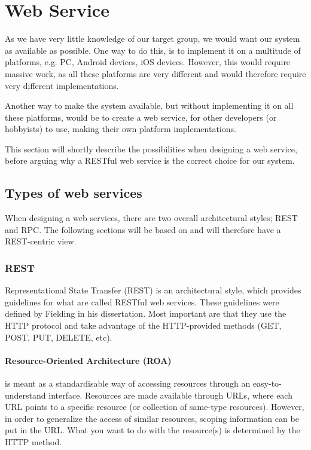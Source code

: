 \section{Web Service}
As we have very little knowledge of our target group, we would want our system as available as possible.
One way to do this, is to implement it on a multitude of platforms, e.g. PC, Android devices, iOS devices.
However, this would require massive work, as all these platforms are very different and would therefore require very different implementations.

Another way to make the system available, but without implementing it on all these platforms, would be to create a web service, for other developers (or hobbyists) to use, making their own platform implementations.

This section will shortly describe the possibilities when designing a web service, before arguing why a RESTful web service is the correct choice for our system.

\subsection{Types of web services}
When designing a web services, there are two overall architectural styles; REST and RPC.
The following sections will be based on \citet{restful_web_services} and will therefore have a REST-centric view.

\subsubsection{REST}
Representational State Transfer (REST) is an architectural style, which provides guidelines for what are called RESTful web services.
These guidelines were defined by Fielding in his dissertation\cite{fielding_dissertation}.
Most important are that they use the HTTP protocol\cite{http_specification} and take advantage of the HTTP-provided methods (GET, POST, PUT, DELETE, etc).

\paragraph{Resource-Oriented Architecture (ROA)} is meant as a standardisable way of accessing resources through an easy-to-understand interface.
Resources are made available through URLs, where each URL points to a specific resource (or collection of same-type resources).
However, in order to generalize the access of similar resources, scoping information can be put in the URL.
What you want to do with the resource(s) is determined by the HTTP method.

